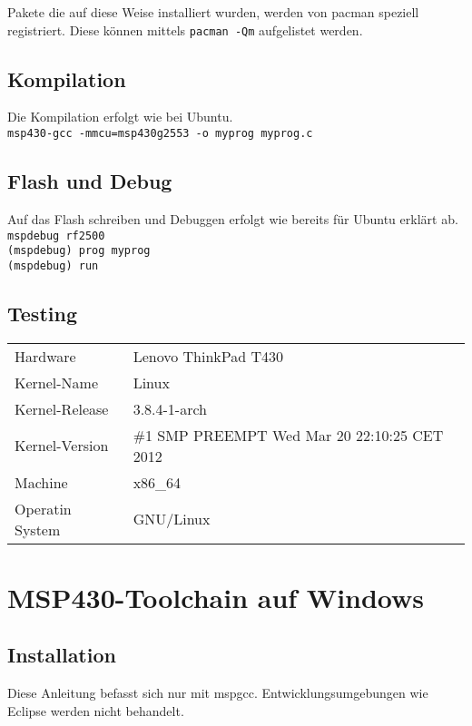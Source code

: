 Pakete die auf diese Weise installiert wurden, werden von pacman speziell 
registriert. Diese können mittels \verb!pacman -Qm! aufgelistet werden.

\subsection{Kompilation}
Die Kompilation erfolgt wie bei Ubuntu. \\

\verb!msp430-gcc -mmcu=msp430g2553 -o myprog myprog.c!

\subsection{Flash und Debug}
Auf das Flash schreiben und Debuggen erfolgt wie bereits für Ubuntu erklärt
ab.\\

\verb!mspdebug rf2500!\\

\verb!(mspdebug) prog myprog!\\

\verb!(mspdebug) run!\\


\subsection{Testing}
\begin{table}[h!]
\centering
\begin{tabular}{ l l }
Hardware        & Lenovo ThinkPad T430 \\
Kernel-Name     & Linux \\
Kernel-Release  & 3.8.4-1-arch \\
Kernel-Version  & \#1 SMP PREEMPT Wed Mar 20 22:10:25 CET 2012 \\
Machine         & x86\_64 \\
Operatin System & GNU/Linux\\
\end{tabular}
\end{table}



\section{MSP430-Toolchain auf Windows}
\subsection{Installation}
Diese Anleitung befasst sich nur mit mspgcc. Entwicklungsumgebungen wie Eclipse 
werden nicht behandelt. 
